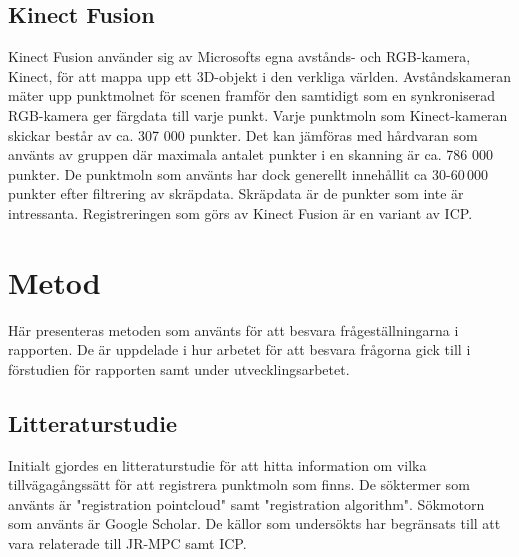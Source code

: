 \subsection{Kinect Fusion}
\label{sec:kinect-karlsson}
Kinect Fusion använder sig av Microsofts egna avstånds- och RGB-kamera, Kinect, för att mappa upp ett 3D-objekt i den verkliga världen. Avståndskameran mäter upp punktmolnet för scenen framför den samtidigt som en synkroniserad RGB-kamera ger färgdata till varje punkt. 
Varje punktmoln som Kinect-kameran skickar består av ca. 307 000 punkter. Det kan jämföras med hårdvaran som använts av gruppen där maximala antalet punkter i en skanning är ca. 786 000 punkter. De punktmoln som använts har dock generellt innehållit ca 30-60\,000 punkter efter filtrering av skräpdata. Skräpdata är de punkter som inte är intressanta. Registreringen som görs av Kinect Fusion är en variant av ICP.

\section{Metod}
\label{sec:method-karlsson}

Här presenteras metoden som använts för att besvara frågeställningarna i rapporten. De är uppdelade i hur arbetet för att besvara frågorna gick till i förstudien för rapporten samt under utvecklingsarbetet.

\subsection{Litteraturstudie}
Initialt gjordes en litteraturstudie för att hitta information om vilka tillvägagångssätt för att registrera punktmoln som finns. De söktermer som använts är "registration pointcloud" samt "registration algorithm". Sökmotorn som använts är Google Scholar. De källor som undersökts har begränsats till att vara relaterade till JR-MPC samt ICP.

